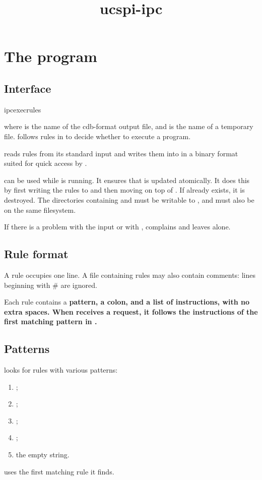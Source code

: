 \documentclass{book}
\title{ucspi-ipc}
\begin{document}
\section{The  program}

\subsection{Interface}
\begin{code}%
  ipcexecrules  
\end{code}
where  is the name of the cdb-format output file, and
 is the name of a temporary file.
 follows rules in  to decide whether to
execute a program.

 reads rules from its standard input and writes them
into  in a binary format suited for quick access by
.

 can be used while  is running.  It
ensures that  is updated atomically.  It does this by first
writing the rules to  and then moving  on top of
.  If  already exists, it is destroyed.  The
directories containing  and  must be writable to
, and must also be on the same filesystem.

If there is a problem with the input or with , 
complains and leaves  alone.

\subsection{Rule format}
A rule occupies one line.  A file containing rules may also contain
comments: lines beginning with # are ignored.

Each rule contains a \bf{pattern}, a colon, and a list of
\bf{instructions}, with no extra spaces.  When  receives a
request, it follows the instructions of the first matching pattern in
.

\subsection{Patterns}
 looks for rules with various patterns:
\begin{enumerate}
\item {};
\item {};
\item {};
\item {};
\item the empty string.
\end{enumerate}
 uses the first matching rule it finds.
\end{document}
